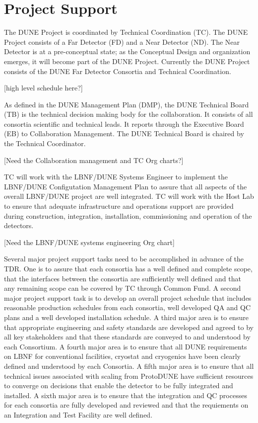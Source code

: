 \section{Project Support}
\label{sec:fdsp-coord-supp}

The DUNE Project is coordinated by Technical Coordination (TC). The
DUNE Project consists of a Far Detector (FD) and a Near Detector
(ND). The Near Detector is at a pre-conceptual state; as the
Conceptual Design and organization emerges, it will become part of the
DUNE Project. Currently the DUNE Project consists of the DUNE Far
Detector Consortia and Technical Coordination.

[high level schedule here?]

As defined in the DUNE Management Plan (DMP), the DUNE Technical Board (TB) is
the technical decision making body for the collaboration. It consists
of all consortia scientific and technical leads. It reports through
the Executive Board (EB) to Collaboration Management. The DUNE Technical
Board is chaired by the Technical Coordinator.

[Need the Collaboration management and TC Org charts?]


TC will work with the LBNF/DUNE Systems Engineer to implement the
LBNF/DUNE Configutation Management Plan to assure that all aspects of
the overall LBNF/DUNE project are well integrated. TC will work
with the Host Lab to ensure that adequate infrastructure and
operations support are provided during construction, integration,
installation, commissioning and operation of the detectors.

[Need the LBNF/DUNE systems engineering Org chart]

Several major project support tasks need to be accomplished in advance
of the TDR.  One is to assure that each consortia has a well defined
and complete scope, that the interfaces between the consortia are
sufficiently well defined and that any remaining scope can be covered
by TC through Common Fund. A second major project support task is to
develop an overall project schedule that includes reasonable
production schedules from each consortia, well developed QA and QC
plans and a well developed installation schedule. A third major area
is to ensure that appropriate engineering and safety standards are
developed and agreed to by all key stakeholders and that these
standards are conveyed to and understood by each Consortium. A fourth
major area is to ensure that all DUNE requirements on LBNF for
conventional facilities, cryostat and cryogenics have been clearly
defined and understood by each Consortia. A fifth major area is to
ensure that all technical issues associated with scaling from
ProtoDUNE have sufficient resources to converge on decisions that
enable the detector to be fully integrated and installed. A sixth
major area is to ensure that the integration and QC processes for each
consortia are fully developed and reviewed and that the requiements on
an Integration and Test Facility are well defined.


